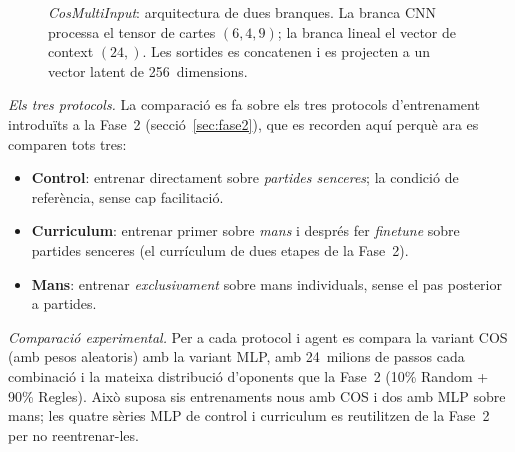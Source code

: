\begin{figure}[H]
{%
  }
  \caption[Arquitectura \emph{CosMultiInput} de dues branques.]{\emph{CosMultiInput}: arquitectura de dues branques. La branca CNN processa
           el tensor de cartes $(6,4,9)$; la branca lineal el vector de context $(24,)$.
           Les sortides es concatenen i es projecten a un vector latent de 256~dimensions.}
  \label{fig:cos-multi-input}
\end{figure}

\emph{Els tres protocols.} La comparació es fa sobre els tres protocols d'entrenament
introduïts a la Fase~2 (secció~\ref{sec:fase2}), que es recorden aquí perquè ara es
comparen tots tres:
\begin{itemize}
  \item \textbf{Control}: entrenar directament sobre \emph{partides senceres}; la condició
        de referència, sense cap facilitació.
  \item \textbf{Curriculum}: entrenar primer sobre \emph{mans} i després fer \emph{finetune}
        sobre partides senceres (el currículum de dues etapes de la Fase~2).
  \item \textbf{Mans}: entrenar \emph{exclusivament} sobre mans individuals, sense el pas
        posterior a partides.
\end{itemize}

\emph{Comparació experimental.} Per a cada protocol i agent es compara la variant COS (amb
pesos aleatoris) amb la variant \ac{MLP}, amb 24~milions de passos cada combinació i la
mateixa distribució d'oponents que la Fase~2 (10\% Random + 90\% Regles). Això suposa sis
entrenaments nous amb COS i dos amb \ac{MLP} sobre mans; les quatre sèries \ac{MLP} de control i
curriculum es reutilitzen de la Fase~2 per no reentrenar-les.

